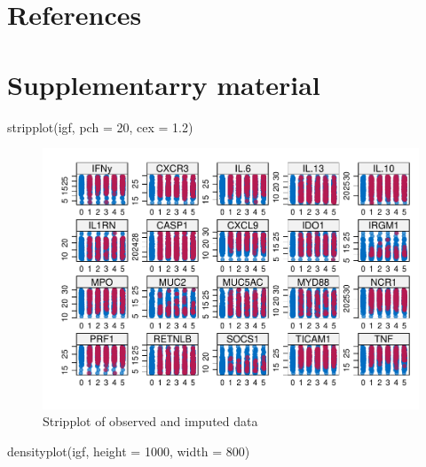 \documentclass[webpdf,large,contemporary,namedate]{oup-authoring-template}
\newenvironment{Shaded}{\begin{snugshade}}{\end{snugshade}}
\newcommand{\AttributeTok}[1]{\textcolor[rgb]{0.77,0.63,0.00}{#1}}
\newcommand{\DecValTok}[1]{\textcolor[rgb]{0.00,0.00,0.81}{#1}}
\newcommand{\FloatTok}[1]{\textcolor[rgb]{0.00,0.00,0.81}{#1}}
\newcommand{\FunctionTok}[1]{\textcolor[rgb]{0.00,0.00,0.00}{#1}}
\newcommand{\NormalTok}[1]{#1}
\theoremstyle{thmstyleone}
\theoremstyle{thmstyletwo}
\theoremstyle{thmstylethree}
\begin{document}
\hypertarget{references}{%
\section{References}\label{references}}

\hypertarget{supplementarry-material}{%
\section{Supplementarry material}\label{supplementarry-material}}

\begin{Shaded}
\begin{Highlighting}[]
\FunctionTok{stripplot}\NormalTok{(igf, }\AttributeTok{pch =} \DecValTok{20}\NormalTok{, }\AttributeTok{cex =} \FloatTok{1.2}\NormalTok{)}
\end{Highlighting}
\end{Shaded}

\begin{figure}[th]
\includegraphics[width=1\linewidth]{x_files/figure-latex/sup_fig2-1} \caption{Stripplot of observed and imputed data}\label{fig:sup_fig2}
\end{figure}

\begin{Shaded}
\begin{Highlighting}[]
\FunctionTok{densityplot}\NormalTok{(igf, }\AttributeTok{height =} \DecValTok{1000}\NormalTok{, }\AttributeTok{width =} \DecValTok{800}\NormalTok{)}
\end{Highlighting}
\end{Shaded}
\end{document}
